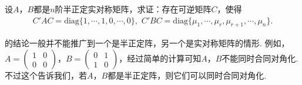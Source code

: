 \documentclass[../../main.tex]{subfiles}%
\begin{document}
\begin{proposition}[两个半正定阵可同时合同对角化]\label{proposition:两个半正定阵可同时合同对角化2}
设\(A\)，\(B\)都是\(n\)阶半正定实对称矩阵，求证：存在可逆矩阵\(C\)，使得
\begin{align*}
C'AC = \mathrm{diag}\{1,\cdots,1,0,\cdots,0\},\,\,C'BC = \mathrm{diag}\{\mu_1,\cdots,\mu_r,\mu_{r + 1},\cdots,\mu_n\}.
\end{align*}
\end{proposition}
\begin{remark}
的结论一般并不能推广到一个是半正定阵，另一个是实对称矩阵的情形. 例如，\(A=\begin{pmatrix}1&0\\0&0\end{pmatrix}\)，\(B=\begin{pmatrix}0&1\\1&0\end{pmatrix}\)，经过简单的计算可知\(A\)，\(B\)不能同时合同对角化. 不过这个告诉我们，若\(A\)，\(B\)都是半正定阵，则它们可以同时合同对角化.
\end{remark}
\end{document}
